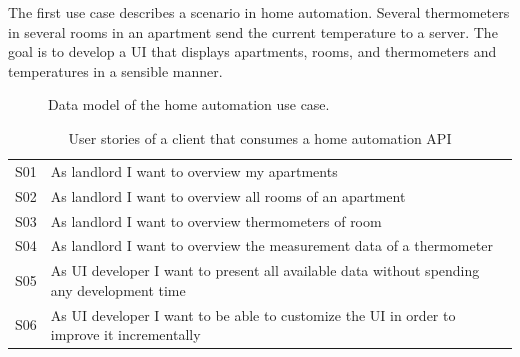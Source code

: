 The first use case describes a scenario in home automation. Several thermometers in several rooms in an apartment send the current temperature to a server. The goal is to develop a UI that displays apartments, rooms, and thermometers and temperatures in a sensible manner.

\begin{figure}[!htb]
  \caption{\label{fig:my-label} Data model of the home automation use case.}
\end{figure}

\begin{table}
\begin{center}
\begin{tabular}{ |c|l| }
 \hline
 S01 & As landlord I want to overview my apartments \\
 S02 & As landlord I want to overview all rooms of an apartment \\
 S03 & As landlord I want to overview thermometers of room \\
 S04 & As landlord I want to overview the measurement data of a thermometer \\
 S05 & As UI developer I want to present all available data without spending any development time \\
 S06 & As UI developer I want to be able to customize the UI in order to improve it incrementally \\
 \hline
\end{tabular}
\caption{User stories of a client that consumes a home automation API}
\end{center}
\end{table}

